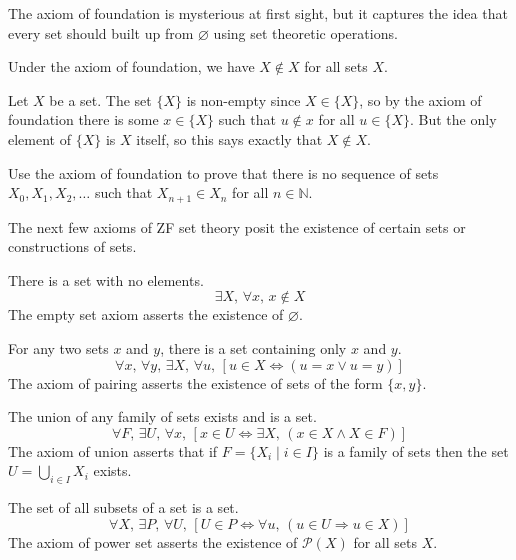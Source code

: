 The axiom of foundation is mysterious at first sight, but it captures the idea that every set should built up from $\varnothing$ using set theoretic operations.

\begin{lemma}
Under the axiom of foundation, we have $X \not \in X$ for all sets $X$.
\end{lemma}

\begin{cproof}
Let $X$ be a set. The set $\{ X \}$ is non-empty since $X \in \{ X \}$, so by the axiom of foundation there is some $x \in \{ X \}$ such that $u \not\in x$ for all $u \in \{ X \}$. But the only element of $\{ X \}$ is $X$ itself, so this says exactly that $X \not\in X$.
\end{cproof}

\begin{exercise}
\label{exStrictlyDecreasingSequenceOfSets}
Use the axiom of foundation to prove that there is no sequence of sets $X_0,X_1,X_2,\dots$ such that $X_{n+1} \in X_n$ for all $n \in \mathbb{N}$.
\end{exercise}

The next few axioms of ZF set theory posit the existence of certain sets or constructions of sets.

\begin{axiom}
\label{axZFCEmptySet}
There is a set with no elements.
\[ \exists X,\, \forall x,\, x \not \in X \]
The empty set axiom asserts the existence of $\varnothing$.
\end{axiom}

\begin{axiom}
\label{axZFCPairing}
For any two sets $x$ and $y$, there is a set containing only $x$ and $y$.
\[ \forall x,\, \forall y,\, \exists X,\, \forall u,\, [u \in X \Leftrightarrow (u=x \vee u=y)] \]
The axiom of pairing asserts the existence of sets of the form $\{ x, y \}$.
\end{axiom}

\begin{axiom}
\label{axZFCUnion}
The union of any family of sets exists and is a set.
\[ \forall F,\, \exists U,\, \forall x,\, [x \in U \Leftrightarrow \exists X,\, (x \in X \wedge X \in F)] \]
The axiom of union asserts that if $F = \{ X_i \mid i \in I \}$ is a family of sets then the set $U=\bigcup_{i \in I} X_i$ exists.
\end{axiom}

\begin{axiom}
\label{axZFCPowerSet}
The set of all subsets of a set is a set.
\[ \forall X,\, \exists P,\, \forall U,\, [U \in P \Leftrightarrow \forall u,\, (u \in U \Rightarrow u \in X)] \]
The axiom of power set asserts the existence of $\mathcal{P}(X)$ for all sets $X$.
\end{axiom}

